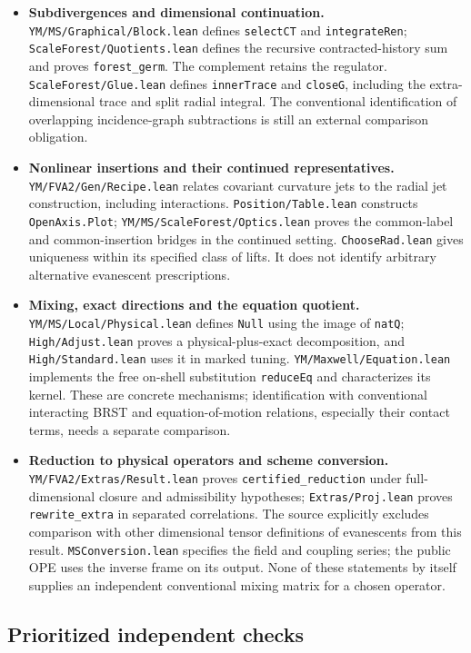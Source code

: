\documentclass[11pt]{article}
\newcommand{\code}[1]{{\small\nolinkurl{#1}}}
\begin{document}
\begin{itemize}
\item \textbf{Subdivergences and dimensional continuation.}
\code{YM/MS/Graphical/Block.lean} defines \code{selectCT} and
\code{integrateRen}; \code{ScaleForest/Quotients.lean} defines the recursive
contracted-history sum and proves \code{forest_germ}. The complement retains
the regulator. \code{ScaleForest/Glue.lean} defines \code{innerTrace} and
\code{closeG}, including the extra-dimensional trace and split radial
integral. The conventional identification of overlapping incidence-graph
subtractions is still an external comparison obligation.
\item \textbf{Nonlinear insertions and their continued representatives.}
\code{YM/FVA2/Gen/Recipe.lean} relates covariant curvature jets to the radial
jet construction, including interactions. \code{Position/Table.lean}
constructs \code{OpenAxis.Plot}; \code{YM/MS/ScaleForest/Optics.lean}
proves the common-label and common-insertion bridges in the continued
setting. \code{ChooseRad.lean} gives uniqueness within its specified class
of lifts. It does not identify arbitrary alternative evanescent prescriptions.
\item \textbf{Mixing, exact directions and the equation quotient.}
\code{YM/MS/Local/Physical.lean} defines \code{Null} using the image of
\code{natQ}; \code{High/Adjust.lean} proves a physical-plus-exact
decomposition, and \code{High/Standard.lean} uses it in marked tuning.
\code{YM/Maxwell/Equation.lean} implements the free on-shell substitution
\code{reduceEq} and characterizes its kernel. These are concrete mechanisms;
identification with conventional interacting BRST and equation-of-motion
relations, especially their contact terms, needs a separate comparison.
\item \textbf{Reduction to physical operators and scheme conversion.}
\code{YM/FVA2/Extras/Result.lean} proves \code{certified_reduction} under
full-dimensional closure and admissibility hypotheses;
\code{Extras/Proj.lean} proves \code{rewrite_extra} in separated correlations.
The source explicitly excludes comparison with other dimensional tensor
definitions of evanescents from this result. \code{MSConversion.lean}
specifies the field and coupling series; the public OPE uses the inverse
frame on its output. None of these statements by itself supplies an
independent conventional mixing matrix for a chosen operator.
\end{itemize}

\subsection{Prioritized independent checks}
\end{document}
